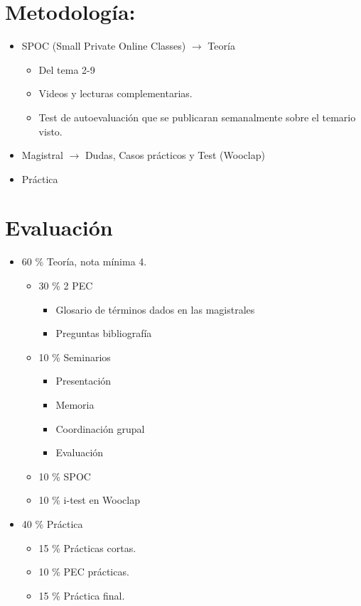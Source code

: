\documentclass[12pt, twoside, openright]{report} %
\begin{document}
\section{Metodología:}
\begin{itemize}
	\item SPOC (Small Private Online Classes) $\rightarrow$ Teoría
	      \begin{itemize}
		      \item Del tema 2-9
		      \item Videos y lecturas complementarias.
		      \item Test de autoevaluación que se publicaran semanalmente sobre el temario visto.
	      \end{itemize}
	\item Magistral $\rightarrow$ Dudas, Casos prácticos y Test (Wooclap)
	\item Práctica
\end{itemize}

\section{Evaluación}
\begin{itemize}
	\item 60 \% Teoría, nota mínima 4.
	      \begin{itemize}
		      \item 30 \% 2 PEC
		            \begin{itemize}
			            \item Glosario de términos dados en las magistrales
			            \item Preguntas bibliografía
		            \end{itemize}
		      \item 10 \% Seminarios
		            \begin{itemize}
			            \item Presentación
			            \item Memoria
			            \item Coordinación grupal
			            \item Evaluación
		            \end{itemize}
		      \item 10 \% SPOC
		      \item 10 \% i-test en Wooclap
	      \end{itemize}
	\item 40 \% Práctica
	      \begin{itemize}
		      \item 15 \% Prácticas cortas.
		      \item 10 \% PEC prácticas.
		      \item 15 \% Práctica final.
	      \end{itemize}
	      
\end{itemize}
\end{document}
